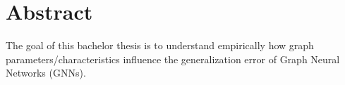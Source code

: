 \chapter*{Abstract}
The goal of this bachelor thesis is to understand empirically how graph parameters/characteristics influence the generalization error of Graph Neural Networks (GNNs).